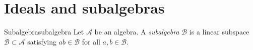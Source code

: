 \section{Ideals and subalgebras}
\begin{definition}{Subalgebra}{subalgebra}
    Let \(\mathscr{A}\) be an algebra. A \emph{subalgebra} \(\mathscr{B}\) is a linear subspace \(\mathscr{B} \subset \mathscr{A}\) satisfying \(ab \in \mathscr{B}\) for all \(a, b \in \mathscr{B}\).
\end{definition}
